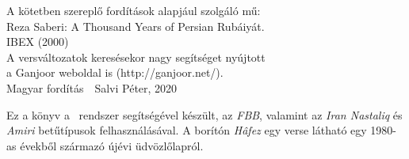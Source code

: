 \thispagestyle{plain}
\begin{center}
  \small
  A kötetben szereplő fordítások alapjául szolgáló mű:\\
  \bigskip
  Reza Saberi: A Thousand Years of Persian Rubáiyát.\\
  IBEX (2000)\\
  \bigskip
  A versváltozatok keresésekor nagy segítséget nyújtott\\
  a Ganjoor weboldal is (http://ganjoor.net/).\\
  \bigskip
  Magyar fordítás\ \textcopyright\ Salvi Péter, 2020
\end{center}
\vspace*{\fill}
{\footnotesize Ez a könyv a \XeLaTeX\ rendszer segítségével készült, az \emph{FBB},
  valamint az \emph{Iran Nastaliq} és \emph{Amiri} betűtípusok felhasználásával.
  A borítón \emph{Hâfez} egy verse látható egy 1980-as évekből származó
  újévi üdvözlőlapról.
}

